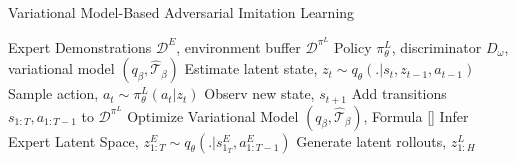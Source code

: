 \begin{algorithm}[t]
    \caption{Variational Model-Based Adversarial Imitation Learning \cite{rafailov2021visual_ail}}
    \label{alg:vmail}
    \begin{algorithmic}
    \REQUIRE Expert Demonstrations $\mathcal{D}^{E}$, environment buffer $\mathcal{D}^{\pi^{L}}$
    \REQUIRE Policy $\pi^{L}_{\theta}$, discriminator $D_{\omega}$, variational model $(q_{\beta}, \hat{\mathcal{T}}_{\beta})$
            \STATE Estimate latent state, $z_{t} \sim q_{\theta}(.|s_{t},z_{t-1},a_{t-1})$
            \STATE Sample action, $a_{t} \sim  \pi^{L}_{\theta}(a_{t}|z_{t})$
            \STATE Observ new state, $s_{t+1}$
        \ENDFOR
        \STATE Add transitions ${s_{1:T}, a_{1:T-1}}$ to $\mathcal{D}^{\pi^{L}}$
            \STATE Optimize Variational Model $(q_{\beta}, \hat{\mathcal{T}}_{\beta})$, Formula \ref{}
            \STATE Infer Expert Latent Space, $z_{1:T}^{E} \sim q_{\theta}(.| s_{1_T}^{E}, a_{1:T-1}^{E})$
            \STATE Generate latent rollouts, $z_{1:H}^{L} $ 
        \ENDFOR
    \ENDFOR
\end{algorithmic}
\end{algorithm}